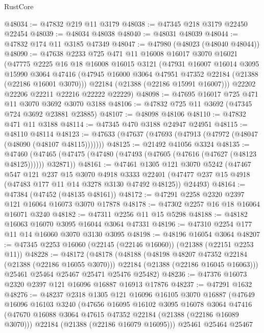 \begin{lexlean}{RustCore}
\begin{coremodule}
@48034 := @47832 @219 @11 @3179
@48038 := @47345 @218 @3179 @22450 @22454
@48039 := @48034 @48038
@48040 := @48031 @48039
@48044 := @47832 @174 @11 @3185 @47349
@48047 := @47980 (@48023 (@48040 @48044))
@48090 := @47638
    @2233
    @725
    @471
    @11
    @16008
    @16017
    @3070
    @16021
    (@47775
      @2225
      @16
      @18
      @16008
      @16015
      @3121
      (@47931
        @16007
        @16014
        @3095
        @15990
        @3064
        @47416
        (@47945 @16000 @3064 @47951 @47352 @22184 (@21388 (@22186 @16001 @3070)))
        @22184
        (@21388 (@22186 @15991 @16007)))
      @22202
      @22206
      @22211
      @22216
      @22222
      @22229)
@48098 := @47695 @16017 @725 @471 @11 @3070 @3692 @3070 @3188
@48106 := @47832 @725 @11 @3692 (@47345 @724 @3692 @23881 @23885)
@48107 := @48098 @48106
@48110 := @47832 @471 @11 @3188
@48114 := @47345 @470 @3188 @24947 @24951
@48115 := @48110 @48114
@48123 := @47633 (@47637 (@47693 (@47913 (@47972 (@48047 (@48090 (@48107 @48115)))))))
@48125 := @21492 @41056 @3324
@48135 := @47460
    (@47465 (@47475 (@47480 (@47493 (@47605 (@47616 (@47627 (@48123 @48125)))))) @32871))
@48161 := @47461
    @1305
    @121
    @3070
    @5242
    (@47467
      @547
      @121
      @237
      @15
      @3070
      @4918
      @3333
      @22401
      (@47477 @237 @15 @4918 (@47483 @177 @11 @14 @3278 @3130 @47492 @48125))
      @24493)
@48164 := @47384 (@47452 (@48135 @48161))
@48172 := @47291 @2258 @2320 @2397 @121 @16064 @16073 @3070 @17878
@48178 := @47302 @2257 @16 @18 @16064 @16071 @3240
@48182 := @47311 @2256 @11 @15 @5298
@48188 := @48182 @16063 @16070 @3095 @16044 @3064 @47331
@48196 := @47310 @2254 @177 @11 @14 @16060 @3070 @3130 @3095
@48198 := @48196 @16054 @3064
@48207 := @47345 @2253 @16060 (@22145 (@22146 @16060)) (@21388 (@22151 @2253 @11))
@48228 := @48172
    (@48178
      (@48188
        (@48198 @48207 @47352 @22184 (@21388 (@22186 @16055 @3070)))
        @22184
        (@21388 (@22186 @16045 @16063)))
      @25461
      @25464
      @25467
      @25471
      @25476
      @25482)
@48236 := @47376 @16073 @2320 @2397 @121 @16096 @16887 @16913 @17876
@48237 := @47291 @1632
@48276 := @48237
    @2318
    @1305
    @121
    @16096
    @16105
    @3070
    @16887
    (@47649
      @16096
      @16103
      @3240
      (@47656
        @16095
        @16102
        @3095
        @16078
        @3064
        @47416
        (@47670 @16088 @3064 @47615 @47352 @22184 (@21388 (@22186 @16089 @3070)))
        @22184
        (@21388 (@22186 @16079 @16095)))
      @25461
      @25464
      @25467

\end{coremodule}
\end{lexlean}
